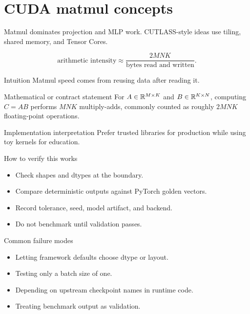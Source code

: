 \chapter{CUDA matmul concepts}
\label{ch:cuda-matmul}
Matmul dominates projection and MLP work. CUTLASS-style ideas use tiling, shared memory, and Tensor Cores. \citep{cutlassDocs}

\[
\text{arithmetic intensity}\approx \frac{2MNK}{\text{bytes read and written}}.
\]

\begin{intuitionbox}{Intuition}
Matmul speed comes from reusing data after reading it.
\end{intuitionbox}

\begin{definitionbox}{Mathematical or contract statement}
For \(A\in\mathbb{R}^{M\times K}\) and \(B\in\mathbb{R}^{K\times N}\), computing \(C=AB\) performs \(MNK\) multiply-adds, commonly counted as roughly \(2MNK\) floating-point operations.
\end{definitionbox}

\begin{implementationbox}{Implementation interpretation}
Prefer trusted libraries for production while using toy kernels for education.
\end{implementationbox}

\begin{verificationbox}{How to verify this works}
\begin{itemize}
\item Check shapes and dtypes at the boundary.
\item Compare deterministic outputs against PyTorch golden vectors.
\item Record tolerance, seed, model artifact, and backend.
\item Do not benchmark until validation passes.
\end{itemize}
\end{verificationbox}

\begin{warningbox}{Common failure modes}
\begin{itemize}
\item Letting framework defaults choose dtype or layout.
\item Testing only a batch size of one.
\item Depending on upstream checkpoint names in runtime code.
\item Treating benchmark output as validation.
\end{itemize}
\end{warningbox}

